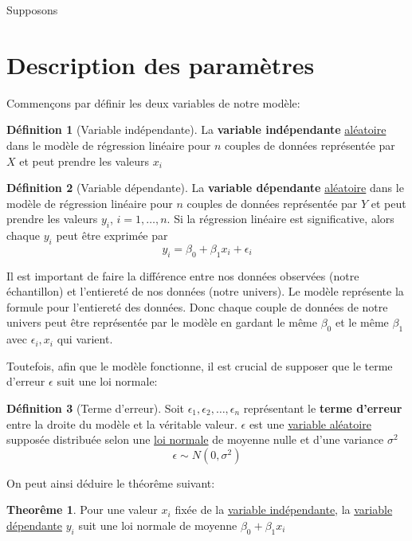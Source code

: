 \documentclass[12pt]{book}
\theoremstyle{definition}
\newtheorem{definition}{Définition}[section]
\newtheorem{theorem}{Theorême}[section]
\begin{document}
Supposons

\section{Description des paramètres}
Commençons par définir les deux variables de notre modèle:

\begin{definition}[Variable indépendante]
    \label{def:variable_independante_modele}
    La \textbf{variable indépendante} \hyperref[def:variable_aleatoire]{aléatoire} dans le modèle de régression linéaire pour $n$ couples de données représentée par $X$ et
    peut prendre les valeurs $x_i$
\end{definition}
\begin{definition}[Variable dépendante]
    \label{def:variable_dependante_modele}
    La \textbf{variable dépendante} \hyperref[def:variable_aleatoire]{aléatoire} dans le modèle de régression linéaire pour $n$ couples de données représentée par $Y$ et
    peut prendre les valeurs $y_i$, $i = 1, \dots, n$.
    Si la régression linéaire est significative, alors chaque $y_i$ peut être exprimée par 
    $$ y_i = \beta_0 + \beta_1x_i + \epsilon_i $$
\end{definition}

Il est important de faire la différence entre nos données observées (notre échantillon) et l'entiereté de nos données (notre univers).
Le modèle représente la formule pour l'entiereté des données. Donc chaque couple de données de notre univers peut être représentée 
par le modèle en gardant le même $\beta_0$ et le même $\beta_1$ avec $\epsilon_i, x_i$ qui varient. 

Toutefois, afin que le modèle fonctionne, il est crucial de supposer que le terme d'erreur $\epsilon$ suit une loi normale:

\begin{definition}[Terme d'erreur]
    \label{def:terme_erreur}
    Soit $\epsilon_1, \epsilon_2, \dots, \epsilon_n$ représentant le \textbf{terme d'erreur} entre 
    la droite du modèle et la véritable valeur. $\epsilon$ est une \hyperref[def:variable_aleatoire]{variable aléatoire}
    supposée distribuée selon une \hyperref[def:loi_normale]{loi normale} de moyenne nulle et d'une variance $\sigma^2$
    $$ \epsilon \sim N(0, \sigma^2) $$
\end{definition}

On peut ainsi déduire le théorême suivant:
\begin{theorem}
    \label{def:y_loi_normale}
    Pour une valeur $x_i$ fixée de la \hyperref[def:variable_independante_modele]{variable indépendante},
    la \hyperref[def:def:variable_dependante_modele]{variable dépendante} $y_i$ suit une loi normale de moyenne 
    $\beta_0 + \beta_1x_i$
\end{theorem}
\end{document}
